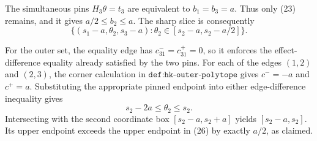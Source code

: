 The simultaneous pins \(H_3\theta=t_3\) are equivalent to \(b_1=b_3=a\).  Thus only (23) remains, and it gives \(a/2\le b_2\le a\).  The sharp slice is consequently
\[
 \{(s_1-a,\theta_2,s_3-a):
       \theta_2\in[s_2-a,s_2-a/2]\}.
\tag{26}
\]

For the outer set, the equality edge has \(c_{31}^-=c_{31}^+=0\), so it enforces the effect-difference equality already satisfied by the two pins.  For each of the edges \((1,2)\) and \((2,3)\), the corner calculation in \(\texttt{def:hk-outer-polytope}\) gives \(c^-=-a\) and \(c^+=a\).  Substituting the appropriate pinned endpoint into either edge-difference inequality gives
\[
 s_2-2a\le\theta_2\le s_2.
\]
Intersecting with the second coordinate box \([s_2-a,s_2+a]\) yields \([s_2-a,s_2]\).  Its upper endpoint exceeds the upper endpoint in (26) by exactly \(a/2\), as claimed.
